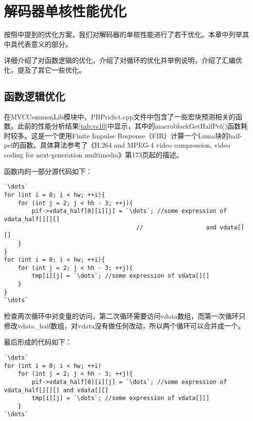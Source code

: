 

\cleardoublepage

\chapter{解码器单核性能优化}
\label{cha:singlecoreopt}

按照中提到的优化方案，我们对解码器的单核性能进行了若干优化。本章中列举其中具代表意义的部分。

详细介绍了对函数逻辑的优化，介绍了对循环的优化并举例说明，介绍了汇编优化，提及了其它一些优化。

\section{函数逻辑优化}
\label{sec:singlecorelogicopt}

在MVCCommonLib模块中，PBPridict.cpp文件中包含了一些宏块预测相关的函数。此前的性能分析结果\autoref{tab:vs10}中显示，其中的macroblockGetHalfPel()函数耗时较多。这是一个使用Finite Impulse Response（FIR）计算一个Luma块的half-pel的函数。具体算法参考了《H.264 and MPEG-4 video compression, video coding for next-generation multimedia》\cite{richardson2003h}第173页起的描述。

函数内的一部分源代码如下：
\begin{lstlisting}[caption = {macroblockGetHalfPel()函数片段（优化前）}, label = lst:macroblockGetHalfPelorig]
`\dots`
for (int i = 0; i < hw; ++i){
	for (int j = 2; j < hh - 3; ++j){
		pif->vdata_half[0][i][j] = `\dots`; //some expression of vdata_half[][][]
		                              //                  and vdata[][]
	}
}
for (int i = 0; i < hw; ++i){
	for (int j = 2; j < hh - 3; ++j){
		tmp[i][j] = `\dots`; //some expression of vdata[][]
	}
}
`\dots`
\end{lstlisting}

检查两次循环中对变量的访问，第二次循环需要访问vdata数组，而第一次循环只修改vdata\_half数组，对vdata没有做任何改动，所以两个循环可以合并成一个。

最后形成的代码如下：

\begin{lstlisting}[caption = {macroblockGetHalfPel()函数片段（优化后）}, label = lst:macroblockGetHalfPelopt]
`\dots`
for (int i = 0; i < hw; ++i)
	for (int j = 2; j < hh - 3; ++j){
		pif->vdata_half[0][i][j] = `\dots`; //some expression of vdata_half[][][] and vdata[][]
		tmp[i][j] = `\dots`; //some expression of vdata[][]
	}
`\dots`
\end{lstlisting}


